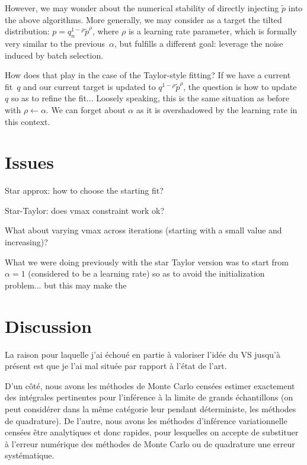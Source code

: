 \documentclass{article}
\begin{document}
However, we may wonder about the numerical stability of directly injecting $\tilde{p}$ into the above algorithms. More generally, we may consider as a target the tilted distribution:
$p = q_n^{1-\rho} \tilde{p}^\rho$, where $\rho$ is a learning rate parameter, which is formally very similar to the previous~$\alpha$, but fulfills a different goal: leverage the noise induced by batch selection.

How does that play in the case of the Taylor-style fitting? If we have a current fit~$q$ and our current target is updated to $q^{1-\rho}\tilde{p}^\rho$, the question is how to update~$q$ so as to refine the fit... Loosely speaking, this is the same situation as before with $\rho\leftarrow\alpha$. We can forget about $\alpha$ as it is overshadowed by the learning rate in this context. 


\section{Issues}

Star approx: how to choose the starting fit? 

Star-Taylor: does vmax constraint work ok?

What about varying vmax across iterations (starting with a small value and increasing)?

What we were doing previously with the star Taylor version was to start from $\alpha=1$ (considered to be a learning rate) so as to avoid the initialization problem... but this may make the 



\section{Discussion}

La raison pour laquelle j'ai \'echou\'e en partie \`a valoriser l'id\'ee du VS jusqu'\`a pr\'esent est que je l'ai mal situ\'ee par rapport \`a l'\'etat de l'art. 

D'un c\^ot\'e, nous avons les m\'ethodes de Monte Carlo cens\'ees estimer exactement des int\'egrales pertinentes pour l'inf\'erence \`a la limite de grands \'echantillons (on peut consid\'erer dans la m\^eme cat\'egorie leur pendant d\'eterministe, les m\'ethodes de quadrature). De l'autre, nous avons les m\'ethodes d'inf\'erence variationnelle cens\'ees \^etre analytiques et donc rapides, pour lesquelles on accepte de substituer \`a l'erreur num\'erique des m\'ethodes de Monte Carlo ou de  quadrature une erreur syst\'ematique.
\end{document}
